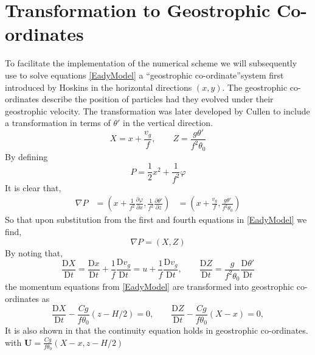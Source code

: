 \section{Transformation to Geostrophic Co-ordinates \label{transformation}}
To facilitate the implementation of the numerical scheme we will subsequently use to solve equations \ref{EadyModel} a \textquotedblleft geostrophic co-ordinate\textquotedblright system first introduced by Hoskins \cite{Hoskins1975} in the horizontal directions $(x,y)$. The geostrophic co-ordinates describe the position of particles had they evolved under their geostrophic velocity. The transformation was later developed by Cullen \cite{Cullen2006a} to include a transformation in terms of $\theta '$ in the vertical direction.
\begin{equation}
	X = x + \frac{v_g}{f}, \qquad Z = \frac{g\theta'}{f^2\theta_0}
\end{equation}
By defining
\begin{equation}
P = \frac{1}{2}x^2 + \frac{1}{f^2}\varphi
\label{P}
\end{equation}
It is clear that,
\begin{equation*}
	\begin{aligned}
		\nabla P &= \left(x + \frac{1}{f^2}\frac{\partial \varphi}{\partial x}, \frac{1}{f^2} \frac{\partial \theta'}{\partial z}\right)
		&= \left(x + \frac{v_g}{f}, \frac{g\theta'}{f^2\theta_0}\right)
	\end{aligned}
\end{equation*}
So that upon substitution from the first and fourth equations in \ref{EadyModel} we find,
\begin{equation}
	\nabla P = (X,Z)
\label{gradP}
\end{equation}
By noting that,
\begin{equation*}
\frac{\mathrm{D}X}{\mathrm{D}t} = \frac{\mathrm{D}x}{\mathrm{D}t} + \frac{1}{f}\frac{\mathrm{D}v_g}{\mathrm{D}t} = u + \frac{1}{f}\frac{\mathrm{D}v_g}{\mathrm{D}t}, \qquad \frac{\mathrm{D}Z}{\mathrm{D}t} = \frac{g}{f^2\theta_0} \frac{\mathrm{D}\theta '}{\mathrm{D}t}
\end{equation*}
the momentum equations from \ref{EadyModel} are transformed into geostrophic co-ordinates as
\begin{equation}
		\frac{\mathrm{D}X}{\mathrm{D}t} -\frac{Cg}{f\theta _0}\left(z-H/2\right) = 0,\qquad
		\frac{\mathrm{D}Z}{\mathrm{D}t} - \frac{Cg}{f\theta_0}\left(X - x\right) = 0,
\label{Gmom}
\end{equation}
It is also shown in \cite{Cullen2006a} that the continuity equation holds in geostrophic co-ordinates. with $\bm{U} = \frac{Cg}{f\theta _0}\left(X-x,z-H/2\right) $
